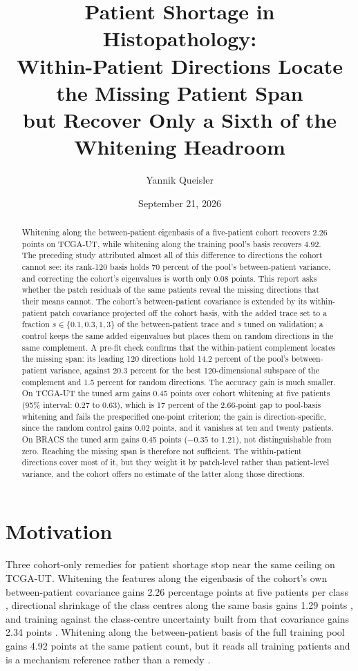 \documentclass[11pt]{article}
\title{Patient Shortage in Histopathology:\\Within-Patient Directions Locate the Missing Patient Span\\but Recover Only a Sixth of the Whitening Headroom}
\author{Yannik Queisler}
\date{September 21, 2026}
\begin{document}
\raggedbottom
{}
\setlength{\emergencystretch}{2em}
\maketitle
\begin{abstract}
\noindent Whitening along the between-patient eigenbasis of a five-patient cohort recovers 2.26 points on TCGA-UT, while whitening along the training pool's basis recovers 4.92. The preceding study attributed almost all of this difference to directions the cohort cannot see: its rank-120 basis holds 70 percent of the pool's between-patient variance, and correcting the cohort's eigenvalues is worth only 0.08 points. This report asks whether the patch residuals of the same patients reveal the missing directions that their means cannot. The cohort's between-patient covariance is extended by its within-patient patch covariance projected off the cohort basis, with the added trace set to a fraction $s\in\{0.1,0.3,1,3\}$ of the between-patient trace and $s$ tuned on validation; a control keeps the same added eigenvalues but places them on random directions in the same complement. A pre-fit check confirms that the within-patient complement locates the missing span: its leading 120 directions hold 14.2 percent of the pool's between-patient variance, against 20.3 percent for the best 120-dimensional subspace of the complement and 1.5 percent for random directions. The accuracy gain is much smaller. On TCGA-UT the tuned arm gains 0.45 points over cohort whitening at five patients (95\% interval: 0.27 to 0.63), which is 17 percent of the 2.66-point gap to pool-basis whitening and fails the prespecified one-point criterion; the gain is direction-specific, since the random control gains 0.02 points, and it vanishes at ten and twenty patients. On BRACS the tuned arm gains 0.45 points ($-0.35$ to 1.21), not distinguishable from zero. Reaching the missing span is therefore not sufficient. The within-patient directions cover most of it, but they weight it by patch-level rather than patient-level variance, and the cohort offers no estimate of the latter along those directions.
\end{abstract}

\section{Motivation}
\label{sec:motivation}
Three cohort-only remedies for patient shortage stop near the same ceiling on TCGA-UT. Whitening the features along the eigenbasis of the cohort's own between-patient covariance gains 2.26 percentage points at five patients per class \citep{queisler2026patientDirections}, directional shrinkage of the class centres along the same basis gains 1.29 points \citep{queisler2026directionalShrinkage}, and training against the class-centre uncertainty built from that covariance gains 2.34 points \citep{queisler2026centreUncertainty}. Whitening along the between-patient basis of the full training pool gains 4.92 points at the same patient count, but it reads all training patients and is a mechanism reference rather than a remedy \citep{queisler2026patientDirections}.
\end{document}
